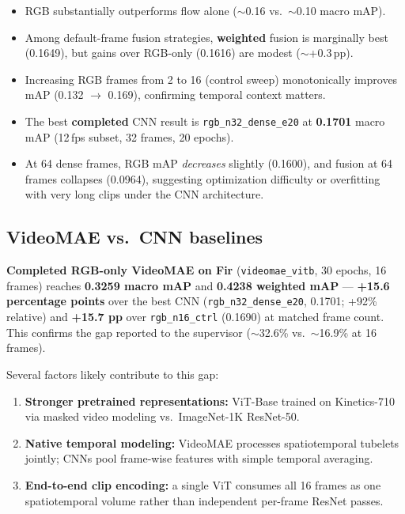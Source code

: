 \documentclass[11pt,a4paper]{article}
\begin{document}
\begin{itemize}[noitemsep]
  \item RGB substantially outperforms flow alone ($\sim$0.16 vs.\ $\sim$0.10 macro mAP).
  \item Among default-frame fusion strategies, \textbf{weighted} fusion is marginally best
        (0.1649), but gains over RGB-only (0.1616) are modest ($\sim$+0.3\,pp).
  \item Increasing RGB frames from 2 to 16 (control sweep) monotonically improves mAP
        (0.132 $\rightarrow$ 0.169), confirming temporal context matters.
  \item The best \textbf{completed} CNN result is \texttt{rgb\_n32\_dense\_e20} at
        \textbf{0.1701} macro mAP (12\,fps subset, 32 frames, 20 epochs).
  \item At 64 dense frames, RGB mAP \emph{decreases} slightly (0.1600), and fusion at
        64 frames collapses (0.0964), suggesting optimization difficulty or overfitting
        with very long clips under the CNN architecture.
\end{itemize}

\subsection{VideoMAE vs.\ CNN baselines}

\textbf{Completed RGB-only VideoMAE on Fir} (\texttt{videomae\_vitb}, 30 epochs,
16 frames) reaches \textbf{0.3259 macro mAP} and \textbf{0.4238 weighted mAP} ---
\textbf{+15.6 percentage points} over the best CNN (\texttt{rgb\_n32\_dense\_e20},
0.1701; +92\% relative) and \textbf{+15.7 pp} over \texttt{rgb\_n16\_ctrl} (0.1690)
at matched frame count. This confirms the gap reported to the supervisor
($\sim$32.6\% vs.\ $\sim$16.9\% at 16 frames).

Several factors likely contribute to this gap:

\begin{enumerate}[noitemsep]
  \item \textbf{Stronger pretrained representations:} ViT-Base trained on Kinetics-710 via
        masked video modeling vs.\ ImageNet-1K ResNet-50.
  \item \textbf{Native temporal modeling:} VideoMAE processes spatiotemporal tubelets
        jointly; CNNs pool frame-wise features with simple temporal averaging.
  \item \textbf{End-to-end clip encoding:} a single ViT consumes all 16 frames as one
        spatiotemporal volume rather than independent per-frame ResNet passes.
\end{enumerate}
\end{document}
